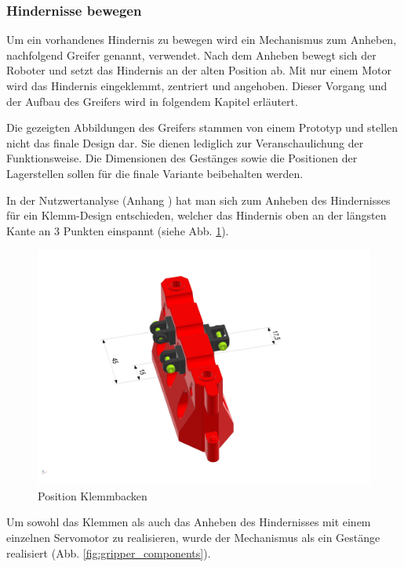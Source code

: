 \newpage

\subsubsection{Hindernisse bewegen}
\label{subsubsection:Hindernisse bewegen}

Um ein vorhandenes Hindernis zu bewegen wird ein Mechanismus zum Anheben, nachfolgend Greifer genannt, verwendet. Nach dem Anheben bewegt sich der Roboter und setzt das Hindernis an der alten Position ab.
Mit nur einem Motor wird das Hindernis eingeklemmt, zentriert und angehoben. Dieser Vorgang und der Aufbau des Greifers wird in folgendem Kapitel erläutert.

Die gezeigten Abbildungen des Greifers stammen von einem Prototyp und stellen nicht das finale Design dar. Sie dienen lediglich zur Veranschaulichung der Funktionsweise. Die Dimensionen des Gestänges sowie die Positionen der Lagerstellen sollen für die finale Variante beibehalten werden.

In der Nutzwertanalyse (Anhang ) hat man sich zum Anheben des Hindernisses für ein Klemm-Design entschieden, welcher das Hindernis oben an der längsten Kante an 3 Punkten einspannt (siehe Abb. \ref{fig:obstacle_clamping_concept}). 


\begin{figure}[H]
\centering
\includegraphics[width=0.95\linewidth]{assets/greifer-prototyp/Greifer_Backen_Trimetric.png} 
\caption{Position Klemmbacken}
\label{fig:obstacle_clamping_concept}
\end{figure}

\newpage

Um sowohl das Klemmen als auch das Anheben des Hindernisses mit einem einzelnen Servomotor zu realisieren, wurde der Mechanismus als ein Gestänge realisiert (Abb. \ref{fig:gripper_components}).

